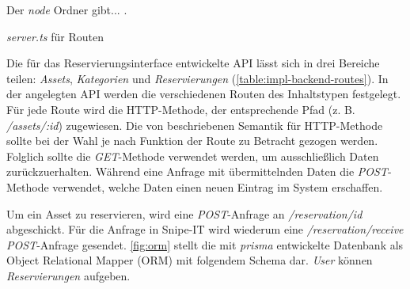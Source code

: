 Der \textit{node} Ordner gibt... .



\textit{server.ts} für Routen


Die für das Reservierungsinterface entwickelte API lässt sich in drei Bereiche teilen:
\textit{Assets}, \textit{Kategorien} und \textit{Reservierungen} (\ref{table:impl-backend-routes}).
In der angelegten API werden die verschiedenen Routen des Inhaltstypen festgelegt. Für jede Route
wird die HTTP-Methode, der entsprechende Pfad (z. B. \textit{/assets/:id}) zugewiesen. Die von
 beschriebenen Semantik für HTTP-Methode sollte bei der Wahl je nach
Funktion der Route zu Betracht gezogen werden. Folglich sollte die \textit{GET}-Methode verwendet
werden, um ausschließlich Daten zurückzuerhalten. Während eine Anfrage mit übermittelnden Daten die
\textit{POST}-Methode verwendet, welche Daten einen neuen Eintrag im System erschaffen.

Um ein Asset zu reservieren, wird eine \textit{POST}-Anfrage an \textit{/reservation/id} abgeschickt. Für die
Anfrage in Snipe-IT wird wiederum eine \textit{/reservation/receive} \textit{POST}-Anfrage gesendet.
\ref{fig:orm} stellt die mit \textit{prisma} entwickelte Datenbank als Object Relational Mapper
(ORM) mit folgendem Schema dar. \textit{User} können \textit{Reservierungen} aufgeben.


